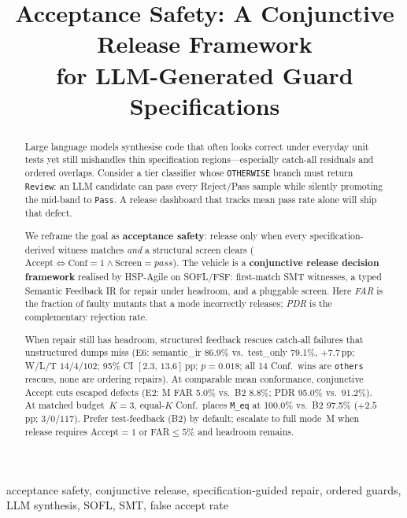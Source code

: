 \documentclass[10pt,conference]{IEEEtran}
\title{Acceptance Safety: A Conjunctive Release Framework\\
for LLM-Generated Guard Specifications}
\author{
\IEEEauthorblockN{Ye Xujun}
\IEEEauthorblockA{East China Normal University\\
Shanghai, China}
}
\begin{document}
\maketitle

\begin{abstract}
Large language models synthesise code that often looks correct under everyday
unit tests yet still mishandles thin specification regions---especially
catch-all residuals and ordered overlaps.
Consider a tier classifier whose \texttt{OTHERWISE} branch must return
\texttt{Review}: an LLM candidate can pass every Reject/Pass sample while
silently promoting the mid-band to \texttt{Pass}.
A release dashboard that tracks mean pass rate alone will ship that defect.

We reframe the goal as \textbf{acceptance safety}: release only when every
specification-derived witness matches \emph{and} a structural screen clears
($\mathrm{Accept}\Leftrightarrow\mathrm{Conf}{=}1\wedge\mathrm{Screen}{=}\mathit{pass}$).
The vehicle is a \textbf{conjunctive release decision framework} realised by
HSP-Agile on SOFL/FSF: first-match SMT witnesses, a typed Semantic Feedback IR
for repair under headroom, and a pluggable screen.
Here \emph{FAR} is the fraction of faulty mutants that a mode incorrectly
releases; \emph{PDR} is the complementary rejection rate.

When repair still has headroom, structured feedback rescues catch-all failures
that unstructured dumps miss (E6: semantic\_ir 86.9\% vs.\ test\_only 79.1\%,
${+}7.7$\,pp; W/L/T $14/4/102$; 95\% CI $[2.3,\,13.6]$\,pp; $p{=}0.018$;
all 14 Conf.\ wins are \texttt{others} rescues, none are ordering repairs).
At comparable mean conformance, conjunctive Accept cuts escaped defects
(E2: M FAR 5.0\% vs.\ B2 8.8\%; PDR 95.0\% vs.\ 91.2\%).
At matched budget~$K{=}3$, equal-$K$ Conf.\ places \texttt{M\_eq} at 100.0\%
vs.\ B2 97.5\% (${+}2.5$\,pp; $3/0/117$).
Prefer test-feedback (B2) by default; escalate to full mode~M when release
requires $\mathrm{Accept}{=}1$ or FAR${\le}5\%$ and headroom remains.
\end{abstract}

\begin{IEEEkeywords}
acceptance safety, conjunctive release, specification-guided repair,
ordered guards, LLM synthesis, SOFL, SMT, false accept rate
\end{IEEEkeywords}

\end{document}
